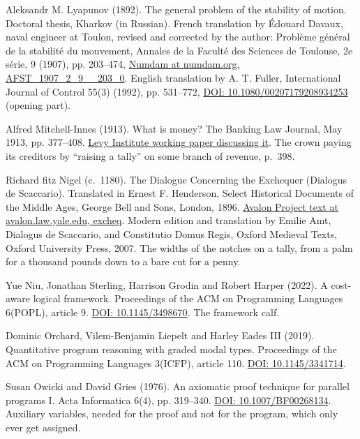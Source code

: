 \documentclass[11pt,twoside]{article}
\theoremstyle{thielethm}
\theoremstyle{thieledef}
\theoremstyle{thieledef}
\theoremstyle{thieledef}
\theoremstyle{thielethm}
\theoremstyle{thieleobs}
\theoremstyle{thielethm}
\begin{document}
\noindent Aleksandr M. Lyapunov (1892). The general problem of the stability of motion. Doctoral thesis, Kharkov (in Russian). French translation by \'Edouard Davaux, naval engineer at Toulon, revised and corrected by the author: Probl\`eme g\'en\'eral de la stabilit\'e du mouvement, Annales de la Facult\'e des Sciences de Toulouse, 2e s\'erie, 9 (1907), pp. 203--474, \href{http://www.numdam.org/item/AFST_1907_2_9__203_0/}{Numdam at numdam.org, AFST\_1907\_2\_9\_\_203\_0}. English translation by A. T. Fuller, International Journal of Control 55(3) (1992), pp. 531--772, \href{https://doi.org/10.1080/00207179208934253}{DOI: 10.1080/00207179208934253} (opening part).
\par\medskip

\noindent Alfred Mitchell-Innes (1913). What is money? The Banking Law Journal, May 1913, pp. 377--408. \href{https://www.levyinstitute.org/pubs/wp_717.pdf}{Levy Institute working paper discussing it}. The crown paying its creditors by ``raising a tally'' on some branch of revenue, p.~398.
\par\medskip

\noindent Richard fitz Nigel (c.\ 1180). The Dialogue Concerning the Exchequer (Dialogus de Scaccario). Translated in Ernest F. Henderson, Select Historical Documents of the Middle Ages, George Bell and Sons, London, 1896. \href{https://avalon.law.yale.edu/medieval/excheq.asp}{Avalon Project text at avalon.law.yale.edu, excheq}. Modern edition and translation by Emilie Amt, Dialogus de Scaccario, and Constitutio Domus Regis, Oxford Medieval Texts, Oxford University Press, 2007. The widths of the notches on a tally, from a palm for a thousand pounds down to a bare cut for a penny.
\par\medskip

\noindent Yue Niu, Jonathan Sterling, Harrison Grodin and Robert Harper (2022). A cost-aware logical framework. Proceedings of the ACM on Programming Languages 6(POPL), article 9. \href{https://doi.org/10.1145/3498670}{DOI: 10.1145/3498670}. The framework calf.
\par\medskip

\noindent Dominic Orchard, Vilem-Benjamin Liepelt and Harley Eades III (2019). Quantitative program reasoning with graded modal types. Proceedings of the ACM on Programming Languages 3(ICFP), article 110. \href{https://doi.org/10.1145/3341714}{DOI: 10.1145/3341714}.
\par\medskip

\noindent Susan Owicki and David Gries (1976). An axiomatic proof technique for parallel programs I. Acta Informatica 6(4), pp. 319--340. \href{https://doi.org/10.1007/BF00268134}{DOI: 10.1007/BF00268134}. Auxiliary variables, needed for the proof and not for the program, which only ever get assigned.
\par\medskip
\end{document}
